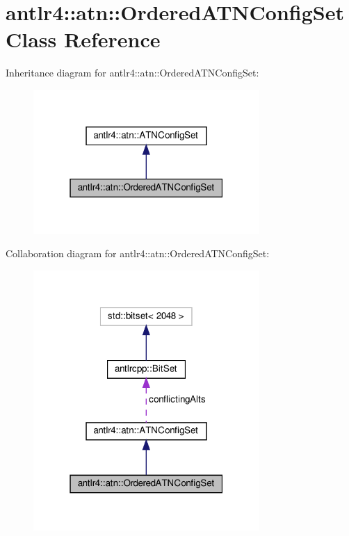 \hypertarget{classantlr4_1_1atn_1_1OrderedATNConfigSet}{}\section{antlr4\+:\+:atn\+:\+:Ordered\+A\+T\+N\+Config\+Set Class Reference}
\label{classantlr4_1_1atn_1_1OrderedATNConfigSet}


Inheritance diagram for antlr4\+:\+:atn\+:\+:Ordered\+A\+T\+N\+Config\+Set\+:
\nopagebreak
\begin{figure}[H]
\begin{center}
\leavevmode
\includegraphics[width=244pt]{classantlr4_1_1atn_1_1OrderedATNConfigSet__inherit__graph}
\end{center}
\end{figure}


Collaboration diagram for antlr4\+:\+:atn\+:\+:Ordered\+A\+T\+N\+Config\+Set\+:
\nopagebreak
\begin{figure}[H]
\begin{center}
\leavevmode
\includegraphics[width=244pt]{classantlr4_1_1atn_1_1OrderedATNConfigSet__coll__graph}
\end{center}
\end{figure}
